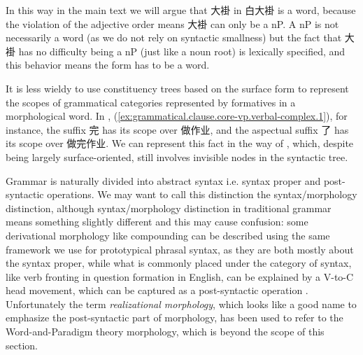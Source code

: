 \documentclass[UTF8, a4paper, oneside, scheme=plain, 12pt]{ctexrep}
\newcommand*{\citepage}[1]{p.~{#1}}
\newcommand*{\term}[1]{\emph{#1}}
\begin{document}
{In this way in the main text we will argue that 大褂 in 白大褂 is a word,
because the violation of the adjective order means 大褂 can only be a nP.
A nP is not necessarily a word (as we do not rely on syntactic smallness)
but the fact that 大褂 has no difficulty being a nP (just like a noun root) is lexically specified,
and this behavior means the form has to be a word.

It is less wieldy to use constituency trees based on the surface form to represent 
the scopes of grammatical categories represented by formatives
in a morphological word.
In , (\ref{ex:grammatical.clause.core-vp.verbal-complex.1}),
for instance, the suffix 完 has its scope over 做作业,
and the aspectual suffix 了 has its scope over 做完作业.
We can represent this fact in the way of ,
which, despite being largely surface-oriented, still involves invisible nodes in the syntactic tree. 

Grammar is naturally divided into abstract syntax i.e. syntax proper and post-syntactic operations.
We may want to call this distinction the syntax/morphology distinction,
although syntax/morphology distinction in traditional grammar means something slightly different and
this may cause confusion: some derivational morphology like compounding can be described using the same framework we use for prototypical phrasal syntax,
as they are both mostly about the syntax proper,
while what is commonly placed under the category of syntax,
like verb fronting in question formation in English,
can be explained by a V-to-C head movement, which can be captured as a post-syntactic operation 
\citep[\citepage{24}]{siddiqi2009syntax}.
Unfortunately the term \term{realizational morphology},
which looks like a good name to emphasize the post-syntactic part of morphology, 
has been used to refer to the Word-and-Paradigm theory morphology,
which is beyond the scope of this section.

}
\end{document}
